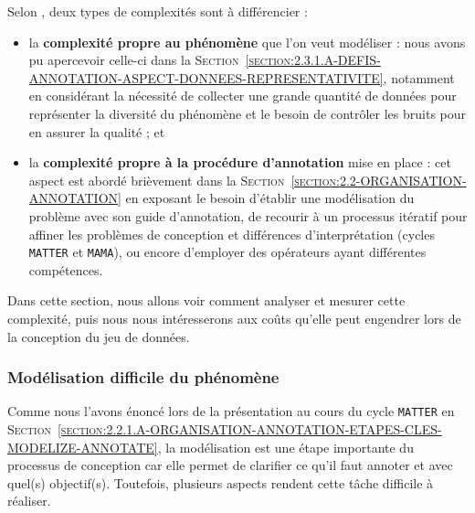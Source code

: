 		Selon \cite{baledent:2022:complexite-annotation-manuelle}, deux types de complexités sont à différencier :
		\begin{itemize}
			\item la \textbf{complexité propre au phénomène} que l'on veut modéliser :
			nous avons pu apercevoir celle-ci dans la \textsc{Section~\ref{section:2.3.1.A-DEFIS-ANNOTATION-ASPECT-DONNEES-REPRESENTATIVITE}}, notamment en considérant la nécessité de collecter une grande quantité de données pour représenter la diversité du phénomène et le besoin de contrôler les bruits pour en assurer la qualité ; et
			\item la \textbf{complexité propre à la procédure d'annotation} mise en place :
			cet aspect est abordé brièvement dans la \textsc{Section~\ref{section:2.2-ORGANISATION-ANNOTATION}} en exposant le besoin d'établir une modélisation du problème avec son guide d'annotation, de recourir à un processus itératif pour affiner les problèmes de conception et différences d'interprétation (cycles \texttt{MATTER} et \texttt{MAMA}), ou encore d'employer des opérateurs ayant différentes compétences.
		\end{itemize}
		Dans cette section, nous allons voir comment analyser et mesurer cette complexité, puis nous nous intéresserons aux coûts qu'elle peut engendrer lors de la conception du jeu de données.
		
		
		\subsubsection{Modélisation difficile du phénomène}
		\label{section:2.3.2.A-DEFIS-ANNOTATION-ASPECT-COMPLEXITE-MODELISATION}
		
			Comme nous l'avons énoncé lors de la présentation au cours du cycle \texttt{MATTER} en \textsc{Section~\ref{section:2.2.1.A-ORGANISATION-ANNOTATION-ETAPES-CLES-MODELIZE-ANNOTATE}}, la modélisation est une étape importante du processus de conception car elle permet de clarifier ce qu'il faut annoter et avec quel(s) objectif(s).
			Toutefois, plusieurs aspects rendent cette tâche difficile à réaliser.
			
